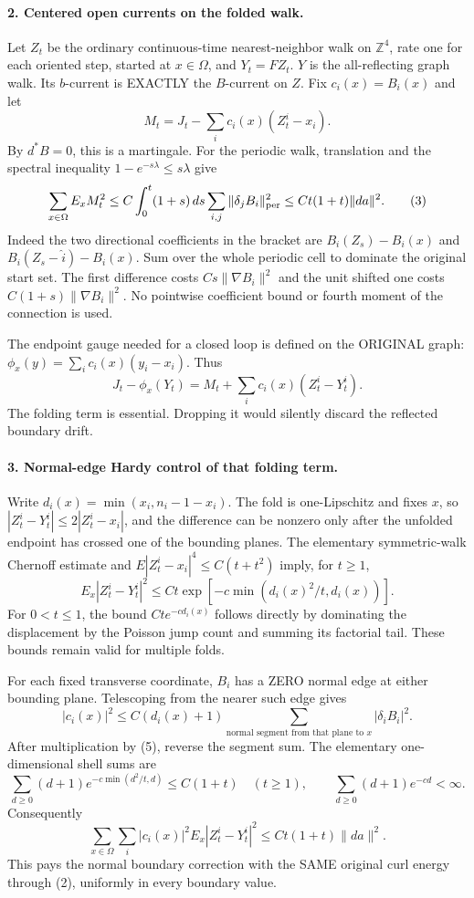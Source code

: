\documentclass[11pt]{article}
\begin{document}
\paragraph{2. Centered open currents on the folded walk.}
Let $Z_t$ be the ordinary continuous-time nearest-neighbor walk on
$\mathbb Z^4$, rate one for each oriented step, started at $x\in\Omega$,
and $Y_t=FZ_t$. $Y$ is the all-reflecting graph walk.
Its $b$-current is EXACTLY the $B$-current on $Z$.
Fix $c_i(x)=B_i(x)$ and let
\[
 M_t=J_t-\sum_i c_i(x)(Z_t^i-x_i).
\]
By $d^*B=0$, this is a martingale. For the periodic walk, translation
and the spectral inequality $1-e^{-s\lambda}\le s\lambda$ give
\[
 \sum_{x\in\Omega}E_x M_t^2
 \le C\int_0^t(1+s)\,ds\sum_{i,j}\|\delta_jB_i\|_{\rm per}^2
 \le Ct(1+t)\|da\|^2.                                      \tag{3}
\]
Indeed the two directional coefficients in the bracket are
$B_i(Z_s)-B_i(x)$ and $B_i(Z_s-\hat i)-B_i(x)$.
Sum over the whole periodic cell to dominate the original start set.
The first difference costs $Cs\|\nabla B_i\|^2$ and the unit shifted
one costs $C(1+s)\|\nabla B_i\|^2$. No pointwise coefficient bound
or fourth moment of the connection is used.

The endpoint gauge needed for a closed loop is defined on the
ORIGINAL graph: $\phi_x(y)=\sum_i c_i(x)(y_i-x_i)$. Thus
\[
 J_t-\phi_x(Y_t)
       =M_t+\sum_i c_i(x)(Z_t^i-Y_t^i).                       \tag{4}
\]
The folding term is essential. Dropping it would silently discard
the reflected boundary drift.

\paragraph{3. Normal-edge Hardy control of that folding term.}
Write $d_i(x)=\min(x_i,n_i-1-x_i)$.
The fold is one-Lipschitz and fixes $x$, so
$|Z_t^i-Y_t^i|\le2|Z_t^i-x_i|$, and the difference can be nonzero only
after the unfolded endpoint has crossed one of the bounding planes.
The elementary symmetric-walk Chernoff estimate and
$E|Z_t^i-x_i|^4\le C(t+t^2)$ imply, for $t\ge1$,
\[
 E_x|Z_t^i-Y_t^i|^2
 \le Ct\exp[-c\min(d_i(x)^2/t,d_i(x))].                       \tag{5}
\]
For $0<t\le1$, the bound $Ct e^{-c d_i(x)}$ follows directly by
dominating the displacement by the Poisson jump count and summing
its factorial tail. These bounds remain valid for multiple folds.

For each fixed transverse coordinate, $B_i$ has a ZERO normal edge
at either bounding plane. Telescoping from the nearer such edge gives
\[
 |c_i(x)|^2\le C(d_i(x)+1)
       \sum_{\text{normal segment from that plane to }x}
                                      |\delta_i B_i|^2 .
\]
After multiplication by (5), reverse the segment sum. The elementary
one-dimensional shell sums are
\[
 \sum_{d\ge0}(d+1)e^{-c\min(d^2/t,d)}\le C(1+t)\quad(t\ge1),
 \qquad
 \sum_{d\ge0}(d+1)e^{-cd}<\infty .
\]
Consequently
\[
 \sum_{x\in\Omega}\sum_i |c_i(x)|^2
              E_x|Z_t^i-Y_t^i|^2
             \le Ct(1+t)\|da\|^2.                           \tag{6}
\]
This pays the normal boundary correction with the SAME original
curl energy through (2), uniformly in every boundary value.
\end{document}
